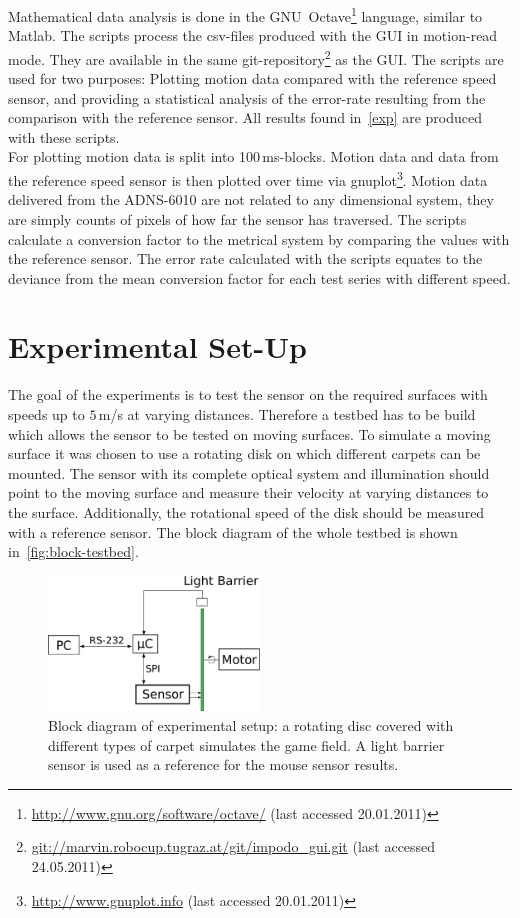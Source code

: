 \documentclass[12pt,a4paper]{article}
\begin{document}
Mathematical data analysis is done in the GNU~Octave\footnote{\url{http://www.gnu.org/software/octave/} (last accessed 20.01.2011)} language, similar to Matlab.
The scripts process the csv-files produced with the GUI in motion-read mode.
They are available in the same git-repository\footnote{\url{git://marvin.robocup.tugraz.at/git/impodo_gui.git} (last accessed 24.05.2011)} as the GUI.
The scripts are used for two purposes: 
Plotting motion data compared with the reference speed sensor, 
and providing a statistical analysis of the error-rate resulting from the comparison with the reference sensor.
All results found in~\autoref{exp} are produced with these scripts.\\
For plotting motion data is split into 100\,ms-blocks.
Motion data and data from the reference speed sensor is then plotted over time via gnuplot\footnote{\url{http://www.gnuplot.info} (last accessed 20.01.2011)}.
Motion data delivered from the ADNS-6010 are not related to any dimensional system, they are simply counts of pixels of how far the sensor has traversed.
The scripts calculate a conversion factor to the metrical system by comparing the values with the reference sensor.
The error rate calculated with the scripts equates to the deviance from the mean conversion factor for each test series with different speed.



\newpage
\section{Experimental Set-Up}

The goal of the experiments is to test the sensor on the required surfaces with speeds up to $5\,$m/s at varying distances.
Therefore a testbed has to be build which allows the sensor to be tested on moving surfaces.
To simulate a moving surface it was chosen to use a rotating disk on which different carpets can be mounted.
The sensor with its complete optical system and illumination should point to the moving surface and measure their velocity at varying distances to the surface.
Additionally, the rotational speed of the disk should be measured with a reference sensor.
The block diagram of the whole testbed is shown in~\autoref{fig:block-testbed}.

\begin{figure}[htbp]
\begin{center}
\includegraphics[width=0.5\textwidth]{figures/block_diagram-testbed.pdf}
\caption{\label{fig:block-testbed}
Block diagram of experimental setup: a rotating disc covered with different types of carpet simulates the game field. 
A light barrier sensor is used as a reference for the mouse sensor results.
}
\end{center}
\end{figure}
\end{document}
